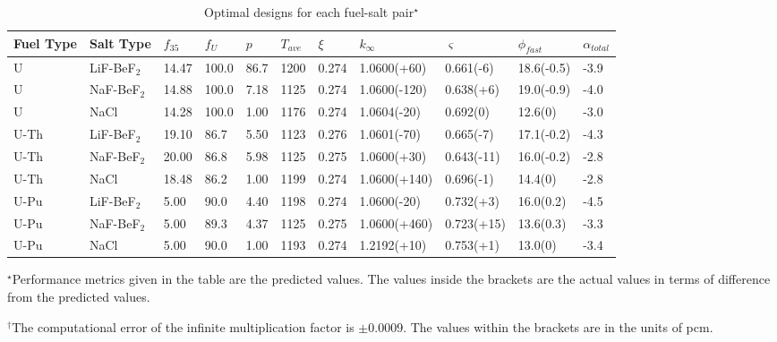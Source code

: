 \begin{landscape}
	\begin{table}[ht!]
		\centering
		\caption{Optimal designs for each fuel-salt pair$^\star$}
		\begin{threeparttable}[t]
			\begin{tabular}{lllllllllll}
				\hline
				\textbf{Fuel Type} & \textbf{Salt Type}  & \textbf{$f_{35}$} &
				\textbf{$f_{U}$} & \textbf{$p$}	& \textbf{$T_{ave}$} & \textbf{$\xi$} &
				\textbf{$k_{\infty}$ \tnote{$\dagger$}}	& \textbf{$\varsigma$
					\tnote{$\ddagger$}}  & \textbf{$\phi_{fast}$ \tnote{$\perp$}} &
				\textbf{${\alpha_{total}}$ 	\tnote{$\wedge$}}  \\
				\hline

				U 	& LiF-BeF$_2$ 	& 14.47 & 100.0 & 86.7 & 1200 & 0.274 & 1.0600(+60) &
				0.661(-6) & 18.6(-0.5) 	& -3.9\\
				U 	& NaF-BeF$_2$ 	& 14.88 & 100.0 & 7.18 & 1125 & 0.274 & 1.0600(-120) &
				0.638(+6) & 19.0(-0.9) 	& -4.0\\
				U 	& NaCl 	& 14.28 & 100.0 & 1.00 & 1176 & 0.274 & 1.0604(-20) &
				0.692(0) & 12.6(0) 	& -3.0\\
				U-Th & LiF-BeF$_2$ 	& 19.10	& 86.7 & 5.50 & 1123 & 0.276 & 1.0601(-70) &
				0.665(-7) & 17.1(-0.2) 	& -4.3\\
				U-Th & NaF-BeF$_2$ 	& 20.00 & 86.8 & 5.98 & 1125 & 0.275 & 1.0600(+30) &
				0.643(-11) & 16.0(-0.2) & -2.8\\
				U-Th 	& NaCl 	& 18.48	& 86.2 	& 1.00 	& 1199 & 0.274 & 1.0600(+140) 	&
				0.696(-1) & 14.4(0)	& -2.8\\
				U-Pu & LiF-BeF$_2$ 	& 5.00 	& 90.0 	& 4.40 	& 1198 & 0.274 & 1.0600(-20) &
				0.732(+3) & 16.0(0.2) & -4.5\\
				U-Pu	& NaF-BeF$_2$ 	& 5.00 	& 89.3 & 4.37 & 1125 & 0.275 & 1.0600(+460) &
				0.723(+15) & 13.6(0.3) 	& -3.3\\
				U-Pu	& NaCl & 5.00 & 90.0 & 1.00 & 1193 	& 0.274 & 1.2192(+10) &
				0.753(+1) & 13.0(0)	& -3.4\\
				\hline
			\end{tabular}
            \rule{0in}{1.2em}$^\star$\scriptsize Performance metrics given in the table are the predicted values. The values inside the brackets are the actual values in terms of difference from the predicted values.

			\rule{0in}{1.2em}$^\dagger$\scriptsize The computational error of the infinite multiplication factor is $\pm$0.0009. The values within the brackets are in the units of pcm.


\end{threeparttable}
\end{table}
\end{landscape}
